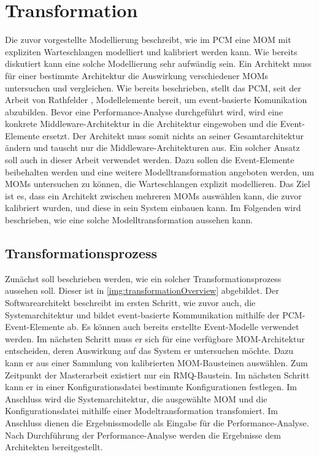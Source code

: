 
\chapter{Transformation}
\label{ch:transformation}
Die zuvor vorgestellte Modellierung beschreibt, wie im PCM eine MOM mit expliziten Warteschlangen modelliert und kalibriert werden kann. Wie bereits diskutiert kann eine solche Modellierung sehr aufwändig sein. Ein Architekt muss für einer bestimmte Architektur die Auswirkung verschiedener MOMs untersuchen und vergleichen. Wie bereits beschrieben, stellt das PCM, seit der Arbeit von Rathfelder \cite{Rathfelder2013}, Modellelemente bereit, um event-basierte Komunikation abzubilden. Bevor eine Performance-Analyse durchgeführt wird, wird eine konkrete Middleware-Architektur in die Architektur eingewoben und die Event-Elemente ersetzt. Der Architekt muss somit nichts an seiner Gesamtarchitektur ändern und tauscht nur die Middleware-Architekturen aus. Ein solcher Ansatz soll auch in dieser Arbeit verwendet werden. Dazu sollen die Event-Elemente beibehalten werden und eine weitere Modelltransformation angeboten werden, um MOMs untersuchen zu können, die Warteschlangen explizit modellieren. Das Ziel ist es, dass ein Architekt zwischen mehreren MOMs auswählen kann, die zuvor kalibriert wurden, und diese in sein System einbauen kann. Im Folgenden wird beschrieben, wie eine solche Modelltransformation aussehen kann.

\section{Transformationsprozess}
Zunächst soll beschrieben werden, wie ein solcher Transformationsprozess aussehen soll. Dieser ist in \autoref{img:transformationOverview} abgebildet. Der Softwarearchitekt beschreibt im ersten Schritt, wie zuvor auch, die Systemarchitektur und bildet event-basierte Kommunikation mithilfe der PCM-Event-Elemente ab. Es können auch bereits erstellte Event-Modelle verwendet werden. Im nächsten Schritt muss er sich für eine verfügbare MOM-Architektur entscheiden, deren Auswirkung auf das System er untersuchen möchte. Dazu kann er aus einer Sammlung von kalibrierten MOM-Bausteinen auswählen. Zum Zeitpunkt der Masterarbeit existiert nur ein RMQ-Baustein. Im nächsten Schritt kann er in einer Konfigurationsdatei bestimmte Konfigurationen festlegen. Im Anschluss wird die Systemarchitektur, die ausgewählte MOM und die Konfigurationsdatei mithilfe einer Modeltransformation transfomiert. Im Anschluss dienen die Ergebnissmodelle als Eingabe für die Performance-Analyse. Nach Durchführung der Performance-Analyse werden die Ergebnisse dem Architekten bereitgestellt.

